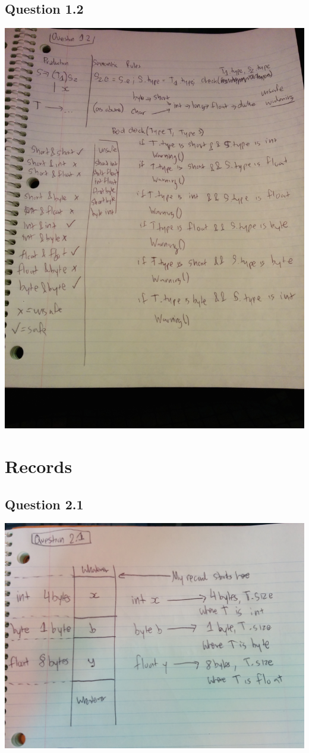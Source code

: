 \documentclass[11pt, oneside]{article}   	%
\begin{document}
\subsection*{Question 1.2}
\includegraphics[scale=0.19]{IMG_20141011_211239.jpg}

\newpage

\section{Records}
\subsection*{Question 2.1}
\includegraphics[scale=0.15]{IMG_20141011_151020.jpg}
\end{document}
